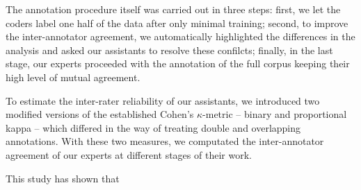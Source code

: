 The annotation procedure itself was carried out in three steps: first,
we let the coders label one half of the data after only minimal
training; second, to improve the inter-annotator agreement, we
automatically highlighted the differences in the analysis and asked
our assistants to resolve these confilcts; finally, in the last stage,
our experts proceeded with the annotation of the full corpus keeping
their high level of mutual agreement.

To estimate the inter-rater reliability of our assistants, we
introduced two modified versions of the established Cohen's
$\kappa$-metric -- binary and proportional kappa -- which differed in
the way of treating double and overlapping annotations.  With these
two measures, we computated the inter-annotator agreement of our
experts at different stages of their work.

This study has shown that

\newpage
